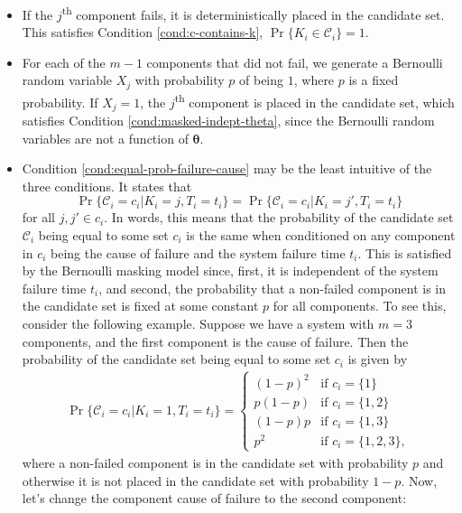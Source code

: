 \documentclass[
]{article}
\theoremstyle{definition}
\theoremstyle{plain}
\theoremstyle{definition}
\theoremstyle{definition}
\theoremstyle{definition}
\theoremstyle{definition}
\theoremstyle{remark}
\begin{document}
\begin{itemize}
\item
  If the \(j\)\textsuperscript{th} component fails, it is deterministically
  placed in the candidate set. This satisfies Condition \ref{cond:c-contains-k},
  \(\Pr\{K_i \in \mathcal{C}_i\} = 1\).
\item
  For each of the \(m-1\) components that did not fail, we generate a Bernoulli
  random variable \(X_j\) with probability \(p\) of being \(1\), where \(p\) is a fixed
  probability. If \(X_j = 1\), the \(j\)\textsuperscript{th} component is placed in
  the candidate set, which satisfies Condition \ref{cond:masked-indept-theta},
  since the Bernoulli random variables are not a function of \(\boldsymbol{\theta}\).
\item
  Condition \ref{cond:equal-prob-failure-cause} may be the least intuitive of
  the three conditions. It states that
  \[
  \Pr\{\mathcal{C}_i = c_i | K_i = j, T_i = t_i\} = \Pr\{\mathcal{C}_i = c_i | K_i = j', T_i = t_i\}
  \]
  for all \(j,j' \in c_i\). In words, this means that the probability of the
  candidate set \(\mathcal{C}_i\) being equal to some set \(c_i\) is the same when
  conditioned on any component in \(c_i\) being the cause of failure and the
  system failure time \(t_i\). This is satisfied by the Bernoulli masking model
  since, first, it is independent of the system failure time \(t_i\), and second,
  the probability that a non-failed component is in the candidate set is fixed
  at some constant \(p\) for all components. To see this, consider the following
  example. Suppose we have a system with \(m = 3\) components, and the first
  component is the cause of failure. Then the probability of the candidate set
  being equal to some set \(c_i\) is given by
  \begin{align}
  \Pr\{\mathcal{C}_i = c_i | K_i = 1, T_i = t_i\} =
  \begin{cases}
     (1-p)^2  & \text{if } c_i = \{1\}\\
     p(1-p)   & \text{if } c_i = \{1,2\}\\
     (1-p)p   & \text{if } c_i = \{1,3\}\\
     p^2      & \text{if } c_i = \{1,2,3\},
  \end{cases}
  \end{align}
  where a non-failed component is in the candidate set with probability \(p\)
  and otherwise it is not placed in the candidate set with probability \(1-p\).
  Now, let's change the component cause of failure to the second component:
  \begin{align}

\end{align}
\end{itemize}
\end{document}
